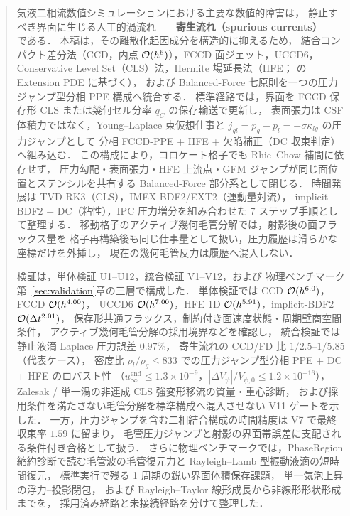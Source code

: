\begin{abstract}
気液二相流数値シミュレーションにおける主要な数値的障害は，
静止すべき界面に生じる人工的渦流れ——\textbf{寄生流れ（spurious currents）}——である．
本稿は，その離散化起因成分を構造的に抑えるため，
結合コンパクト差分法（CCD，内点 $\Ord{h^6}$），FCCD 面ジェット，UCCD6，
Conservative Level Set（CLS）法，Hermite 場延長法（HFE；\cite{Aslam2004} の Extension PDE に基づく），
および Balanced-Force 七原則を一つの圧力ジャンプ型分相 PPE 構成へ統合する．
標準経路では，界面を FCCD 保存形 CLS または幾何セル分率 $q_C$ の保存輸送で更新し，
表面張力は CSF 体積力ではなく，Young--Laplace 束仮想仕事と
$j_{gl}=p_g-p_l=-\sigma\kappa_{lg}$ の圧力ジャンプとして
分相 FCCD-PPE + HFE + 欠陥補正（DC 収束判定）へ組み込む．
この構成により，コロケート格子でも Rhie--Chow 補間に依存せず，
圧力勾配・表面張力・HFE 上流点・GFM ジャンプが同じ面位置とステンシルを共有する
Balanced-Force 部分系として閉じる．
時間発展は TVD-RK3（CLS），IMEX-BDF2/EXT2（運動量対流），
implicit-BDF2 + DC（粘性），IPC 圧力増分を組み合わせた 7 ステップ手順として整理する．
移動格子のアクティブ幾何毛管分解では，射影後の面フラックス量を
格子再構築後も同じ仕事量として扱い，圧力履歴は滑らかな座標だけを外挿し，
現在の幾何毛管反力は履歴へ混入しない．

検証は，単体検証 U1--U12，統合検証 V1--V12，および
物理ベンチマーク第~\ref{sec:validation}章の三層で構成した．
単体検証では CCD $\Ord{h^{6.0}}$，FCCD $\Ord{h^{4.00}}$，
UCCD6 $\Ord{h^{7.00}}$，HFE 1D $\Ord{h^{5.91}}$，implicit-BDF2 $\Ord{\Delta t^{2.01}}$，
保存形共通フラックス，制約付き面速度状態・周期壁商空間条件，
アクティブ幾何毛管分解の採用境界などを確認し，
統合検証では静止液滴 Laplace 圧力誤差 $0.97\%$，
寄生流れの CCD/FD 比 $1/2.5$--$1/5.85$（代表ケース），
密度比 $\rho_l/\rho_g\le833$ での圧力ジャンプ型分相 PPE + DC + HFE のロバスト性
（$u_\infty^{\mathrm{end}}\le1.3\times10^{-9}$，$|\Delta V_\psi|/V_{\psi,0}\le1.2\times10^{-16}$），
Zalesak / 単一渦の非連成 CLS 強変形移流の質量・重心診断，
および採用条件を満たさない毛管分解を標準構成へ混入させない V11 ゲートを示した．
一方，圧力ジャンプを含む二相結合構成の時間精度は V7 で最終収束率 $1.59$ に留まり，
毛管圧力ジャンプと射影の界面帯誤差に支配される条件付き合格として扱う．
さらに物理ベンチマークでは，PhaseRegion 縮約診断で読む毛管波の毛管復元力と
Rayleigh--Lamb 型振動液滴の短時間復元，
標準実行で残る 1 周期の鋭い界面体積保存課題，
単一気泡上昇の浮力--投影閉包，
および Rayleigh--Taylor 線形成長から非線形形状形成までを，
採用済み経路と未接続経路を分けて整理した．
\end{abstract}
